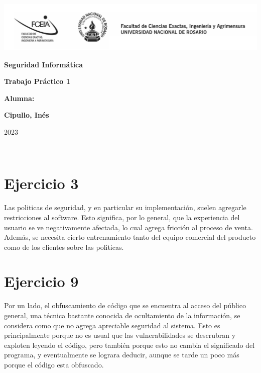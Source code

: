 \documentclass[11pt]{article}
\begin{document}
\begin{titlepage}
    \hspace{-2.5cm}\includegraphics[scale= 0.48]{../header.png}
    \begin{center}
        \vfill
            \noindent\textbf{\Huge Seguridad Informática}\par
            \vspace{.5cm}
            \noindent\textbf{\Huge Trabajo Práctico 1}\par
            \vspace{.5cm}
        \vfill
        \noindent \textbf{\huge Alumna:}\par
        \vspace{.5cm}
        \noindent \textbf{\Large Cipullo, Inés}\par
 
        \vfill
        \noindent\large 2023
    \end{center}
\end{titlepage}
\ \par

\section*{Ejercicio 3}
Las politicas de seguridad, y en particular su implementación, suelen agregarle restricciones al 
software. Esto significa, por lo general, que la experiencia del usuario se ve negativamente afectada, 
lo cual agrega fricción al proceso de venta. Además, se necesita cierto entrenamiento tanto del equipo 
comercial del producto como de los clientes sobre las politicas.

\section*{Ejercicio 9}
Por un lado, el obfuscamiento de código que se encuentra al acceso del público general, una técnica 
bastante conocida de ocultamiento de la información, se considera como que no agrega apreciable 
seguridad al sistema. Esto es principalmente porque no es usual que las vulnerabilidades se descrubran 
y exploten leyendo el código, pero también porque esto no cambia el significado del programa, y 
eventualmente se lograra deducir, aunque se tarde un poco más porque el código esta obfuscado. 
\end{document}
